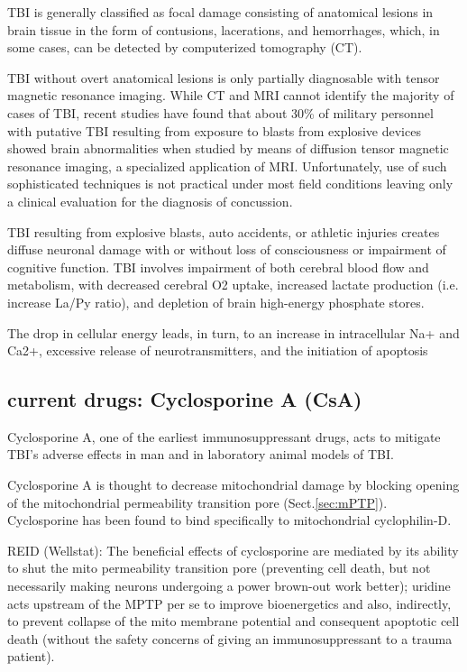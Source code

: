 TBI is generally classified as focal damage consisting of anatomical
lesions in brain tissue in the form of contusions, lacerations,
and hemorrhages, which, in some cases, can be detected
by computerized tomography (CT).


TBI without overt anatomical lesions is only partially diagnosable with tensor
magnetic resonance imaging.
While CT and MRI cannot identify the majority of cases of TBI, recent studies
have found that about 30\% of military personnel with putative TBI resulting
from exposure to blasts from explosive devices showed brain abnormalities when
studied by means of diffusion tensor magnetic resonance imaging, a specialized
application of MRI. Unfortunately, use of such sophisticated techniques is not
practical under most field conditions leaving only a clinical evaluation for the
diagnosis of concussion.

TBI resulting from explosive blasts, auto accidents, or athletic injuries
creates diffuse neuronal damage with or without loss of consciousness or
impairment of cognitive function. TBI involves impairment of both cerebral blood
flow and metabolism, with decreased cerebral O2 uptake, increased lactate
production (i.e. increase La/Py ratio), and depletion of brain high-energy
phosphate stores.

The drop in cellular energy leads, in turn, to an increase in intracellular Na+
and Ca2+, excessive release of neurotransmitters, and the initiation of
apoptosis

\subsection{current drugs: Cyclosporine A (CsA)}
\label{sec:cyclosporine-A}

Cyclosporine A, one of the earliest immunosuppressant drugs, acts to mitigate
TBI's adverse effects in man and in laboratory animal models of TBI.

Cyclosporine A is thought to decrease mitochondrial damage by blocking opening
of the mitochondrial permeability transition pore (Sect.\ref{sec:mPTP}).
Cyclosporine has been found to bind specifically to mitochondrial cyclophilin-D.


REID (Wellstat): The beneficial effects of cyclosporine are mediated by its
ability to shut the mito permeability transition pore (preventing cell death,
but not necessarily making neurons undergoing a power brown-out work better);
uridine acts upstream of the MPTP per se to improve bioenergetics and also,
indirectly, to prevent collapse of the mito membrane potential and consequent
apoptotic cell death (without the safety concerns of giving an immunosuppressant
to a trauma patient).





